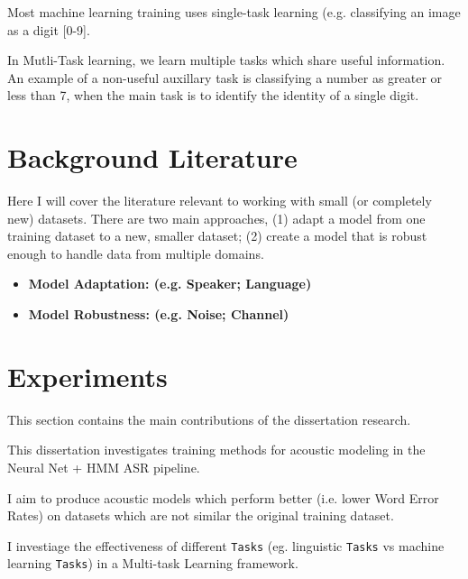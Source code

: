 \documentclass[10pt,a4paper]{article}
\begin{document}
Most machine learning training uses single-task learning (e.g. classifying an image as a digit [0-9].

In Mutli-Task learning, we learn multiple tasks which share useful information. An example of a non-useful auxillary task is classifying a number as greater or less than 7, when the main task is to identify the identity of a single digit.






\newpage

\section{Background Literature}

Here I will cover the literature relevant to working with small (or completely new) datasets. There are two main approaches, (1) adapt a model from one training dataset to a new, smaller dataset; (2) create a model that is robust enough to handle data from multiple domains. 

\begin{itemize}

\item \textbf{Model Adaptation: (e.g. Speaker; Language)}

    
  
\item \textbf{Model Robustness: (e.g. Noise; Channel)}

  
\end{itemize}



\newpage

\section{Experiments}

This section contains the main contributions of the dissertation research.

This dissertation investigates training methods for acoustic modeling in the Neural Net + HMM ASR pipeline.

I aim to produce acoustic models which perform better (i.e. lower Word Error Rates) on datasets which are not similar the original training dataset.

I investiage the effectiveness of different \texttt{Tasks} (eg. linguistic \texttt{Tasks} vs machine learning \texttt{Tasks}) in a Multi-task Learning framework.
\end{document}
